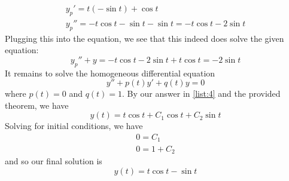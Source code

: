 \documentclass[12pt]{article}
\begin{document}
\begin{enumerate}
\begin{gather*}
              y_p'=t(-\sin t)+\cos t \\
              y_p''=-t \cos t - \sin t - \sin t=-t \cos t - 2 \sin t
          \end{gather*}
          Plugging this into the equation, we see that this indeed does solve the given equation:
          \[y_p''+y=-t \cos t - 2 \sin t + t \cos t=-2 \sin t\]
          It remains to solve the homogeneous differential equation
          \[y''+p(t)y'+q(t)y=0\]
          where $p(t)=0$ and $q(t)=1$.
          By our answer in \ref{list:4} and the provided theorem, we have
          \[y(t)=t \cos t + C_1 \cos t + C_2 \sin t\]
          Solving for initial conditions, we have
          \begin{gather*}
              0=C_1 \\
              0=1+C_2
          \end{gather*}
          and so our final solution is
          \[\boxed{y(t)=t \cos t - \sin t}\]
\end{enumerate}
\end{document}
